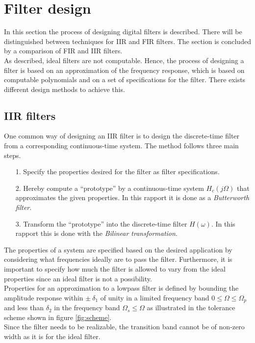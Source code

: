 \section{Filter design}
In this section the process of designing digital filters is described. There will be distinguished between techniques for IIR and FIR filters. The section is concluded by a comparison of FIR and IIR filters. \\  
As described, ideal filters are not computable. Hence, the process of designing a filter is based on an approximation of the frequency response, which is based on computable polynomials and on a set of specifications for the filter. There exists different design methods to achieve this.

\subsection{IIR filters}
One common way of designing an IIR filter is to design the discrete-time filter from a corresponding continuous-time system. The method follows three main steps. 
\begin{itemize}
\item[1.] Specify the properties desired for the filter as filter specifications.
\item[2.] Hereby compute a ``prototype'' by a continuous-time system $H_c(j\Omega)$ that approximates the given properties. In this rapport it is done as a \textit{Butterworth filter}.  
\item[3.] Transform the ``prototype'' into the discrete-time filter $H(\omega)$. In this rapport this is done with the \textit{Bilinear transformation}. 
\end{itemize}

The properties of a system are specified based on the desired application by considering what frequencies ideally are to pass the filter. Furthermore, it is important to specify how much the filter is allowed to vary from the ideal properties since an ideal filter is not a possibility. \\
Properties for an approximation to a lowpass filter is defined by bounding the amplitude response within $\pm \ \delta_1$ of unity in a limited frequency band $0 \leq \Omega \leq \Omega_p $ and less than $\delta_2$ in the frequency band $\Omega_s \leq \Omega$ as illustrated in the tolerance scheme shown in figure \ref{fig:scheme}. \\
Since the filter needs to be realizable, the transition band cannot be of non-zero width as it is for the ideal filter.

